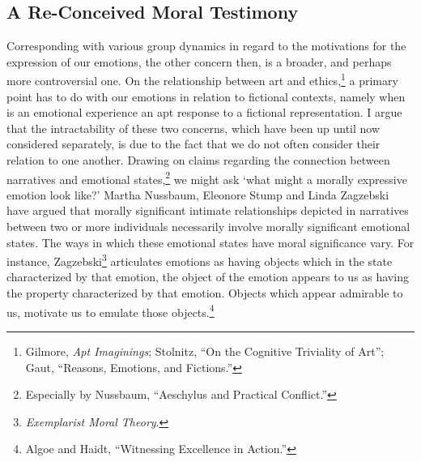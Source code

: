 \documentclass[phdthesis,12pt,final]{wuthesis}
\theoremstyle{definition}
\theoremstyle{definition}
\theoremstyle{definition}
\theoremstyle{definition}
\theoremstyle{remark}
\begin{document}
\subsection*{A Re-Conceived Moral Testimony}\label{a-re-conceived-moral-testimony}

Corresponding with various group dynamics in regard to the motivations for the expression of our emotions, the other concern then, is a broader, and perhaps more controversial one. On the relationship between art and ethics,\footnote{Gilmore, \emph{Apt {Imaginings}}; Stolnitz, {``On the {Cognitive Triviality} of {Art}''}; Gaut, {``Reasons, Emotions, and Fictions.''}} a primary point has to do with our emotions in relation to fictional contexts, namely when is an emotional experience an apt response to a fictional representation. I argue that the intractability of these two concerns, which have been up until now considered separately, is due to the fact that we do not often consider their relation to one another. Drawing on claims regarding the connection between narratives and emotional states,\footnote{Especially by Nussbaum, {``Aeschylus and Practical Conflict.''}} we might ask `what might a morally expressive emotion look like?' Martha Nussbaum, Eleonore Stump and Linda Zagzebski have argued that morally significant intimate relationships depicted in narratives between two or more individuals necessarily involve morally significant emotional states. The ways in which these emotional states have moral significance vary. For instance, Zagzebski\footnote{\emph{Exemplarist {Moral Theory}}.} articulates emotions as having objects which in the state characterized by that emotion, the object of the emotion appears to us as having the property characterized by that emotion. Objects which appear admirable to us, motivate us to emulate those objects.\footnote{Algoe and Haidt, {``Witnessing Excellence in Action.''}}
\end{document}
